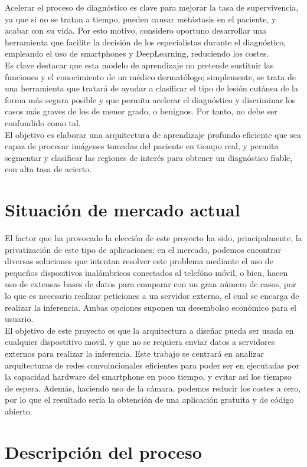 Acelerar el proceso de diagnóstico es clave para mejorar la tasa de supervivencia, ya que si no se tratan a tiempo, pueden causar metástasis en el paciente, y acabar con su vida. Por esto motivo, considero oportuno desarrollar una herramienta que facilite la decisión de los especialistas durante el diagnóstico, empleando el uso de smartphones y DeepLearning, reduciendo los costes.\\

Es clave destacar que esta modelo de aprendizaje no pretende sustituir las funciones y el conocimiento de un médico dermatólogo; simplemente, se trata de una herramienta que tratará de ayudar a clasificar el tipo de lesión cutánea de la forma más segura posible y que permita acelerar el diagnóstico y discriminar los casos más graves de los de menor grado, o benignos. Por tanto, no debe ser confundido como tal.\\

El objetivo es elaborar una arquitectura de aprendizaje profundo eficiente que sea capaz de procesar imágenes tomadas del paciente en tiempo real, y permita segmentar y clasificar las regiones de interés para obtener un diagnóstico fiable, con alta tasa de acierto.

\section{Situación de mercado actual}

El factor que ha provocado la elección de este proyecto ha sido, principalmente, la privatización de este tipo de aplicaciones; en el mercado, podemos encontrar diversas soluciones que intentan resolver este problema mediante el uso de pequeños dispositivos inalámbricos conectados al telefóno móvil, o bien, hacen uso de extensas bases de datos para comparar con un gran número de casos, por lo que es necesario realizar peticiones a un servidor externo, el cual se encarga de realizar la inferencia. Ambas opciones suponen un desembolso económico para el usuario.\\

El objetivo de este proyecto es que la arquitectura a diseñar pueda ser usada en cualquier dispostitivo movil, y que no se requiera enviar datos a servidores externos para realizar la inferencia. Este trabajo se centrará en analizar arquitecturas de redes convolucionales eficientes para poder ser en ejecutadas por la capacidad hardware del smartphone en poco tiempo, y evitar así los tiempso de espera. Además, haciendo uso de la cámara, podemos reducir los costes a cero, por lo que el resultado sería la obtención de una aplicación gratuita y de código abierto.

\section {Descripción del proceso}